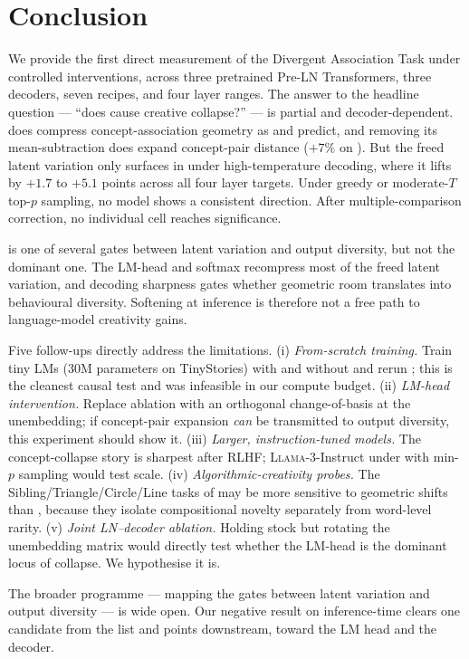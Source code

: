 \section{Conclusion}
\label{sec:conclusion}

We provide the first direct measurement of the Divergent Association Task
under controlled \layernorm interventions, across three pretrained Pre-LN
Transformers, three decoders, seven recipes, and four layer ranges. The
answer to the headline question --- ``does \layernorm cause creative
collapse?'' --- is partial and decoder-dependent. \layernorm does compress
concept-association geometry as \citet{brody2023expressivity} and
\citet{gupta2024geometric} predict, and removing its mean-subtraction does
expand concept-pair distance ($+7\%$ on \pythia). But the freed latent
variation only surfaces in \dat under high-temperature decoding, where it
lifts \gptsmall \dat by $+1.7$ to $+5.1$ points across all four layer
targets. Under greedy or moderate-$T$ top-$p$ sampling, no model shows a
consistent direction. After multiple-comparison correction, no individual
cell reaches significance.

\layernorm is one of several gates between latent variation and output
diversity, but not the dominant one. The LM-head and softmax recompress
most of the freed latent variation, and decoding sharpness gates whether
geometric room translates into behavioural diversity. Softening
\layernorm at inference is therefore not a free path to language-model
creativity gains.

Five follow-ups directly address the limitations.
(i) \emph{From-scratch training.} Train tiny LMs (\eg 30M parameters on
TinyStories) with and without \layernorm and rerun \dat; this is the
cleanest causal test and was infeasible in our compute budget.
(ii) \emph{LM-head intervention.} Replace \layernorm ablation with an
orthogonal change-of-basis at the unembedding; if concept-pair expansion
\emph{can} be transmitted to output diversity, this experiment should
show it.
(iii) \emph{Larger, instruction-tuned models.} The concept-collapse story
is sharpest after RLHF; \textsc{Llama}-3-Instruct under \nomean with
min-$p$ sampling would test scale.
(iv) \emph{Algorithmic-creativity probes.} The Sibling/Triangle/Circle/Line
tasks of \citet{nagarajan2025roll} may be more sensitive to geometric
shifts than \dat, because they isolate compositional novelty separately
from word-level rarity.
(v) \emph{Joint LN--decoder ablation.} Holding \layernorm stock but
rotating the unembedding matrix would directly test whether the LM-head
is the dominant locus of collapse. We hypothesise it is.

The broader programme --- mapping the gates between latent variation and
output diversity --- is wide open. Our negative result on inference-time
\layernorm clears one candidate from the list and points downstream,
toward the LM head and the decoder.
